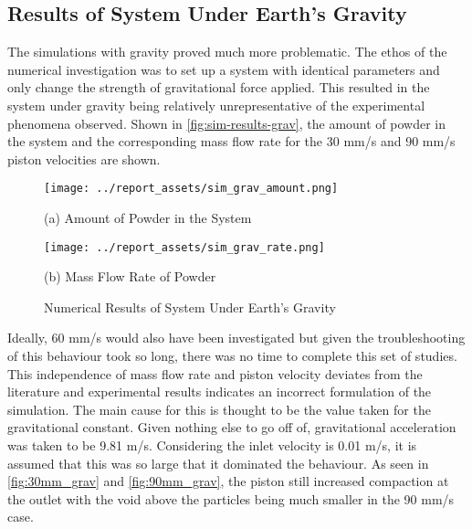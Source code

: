 \subsection{Results of System Under Earth's Gravity}
The simulations with gravity proved much more problematic. The ethos of the numerical investigation was to set up a system with identical parameters and only change the strength of gravitational force applied. This resulted in the system under gravity being relatively unrepresentative of the experimental phenomena observed. Shown in \autoref{fig:sim-results-grav}, the amount of powder in the system and the corresponding mass flow rate for the 30 mm/s and 90 mm/s piston velocities are shown.
\begin{figure}[htbp]
    \centering

    \begin{minipage}{0.45\textwidth}
        \centering
        \texttt{[image: ../report\_assets/sim\_grav\_amount.png]}
        \caption*{(a) Amount of Powder in the System}
    \end{minipage}    
    \hfill
    \begin{minipage}{0.45\textwidth}
        \centering
        \texttt{[image: ../report\_assets/sim\_grav\_rate.png]}
        \caption*{(b) Mass Flow Rate of Powder}
    \end{minipage}    
    \caption{Numerical Results of System Under Earth's Gravity}\label{fig:sim-results-grav}

\end{figure} 
Ideally, 60 mm/s would also have been investigated but given the troubleshooting of this behaviour took so long, there was no time to complete this set of studies. This independence of mass flow rate and piston velocity deviates from the literature and experimental results indicates an incorrect formulation of the simulation. The main cause for this is thought to be the value taken for the gravitational constant. Given nothing else to go off of, gravitational acceleration was taken to be 9.81 m/s. Considering the inlet velocity is 0.01 m/s, it is assumed that this was so large that it dominated the behaviour. As seen in \autoref{fig:30mm_grav} and \autoref{fig:90mm_grav}, the piston still increased compaction at the outlet with the void above the particles being much smaller in the 90 mm/s case.
